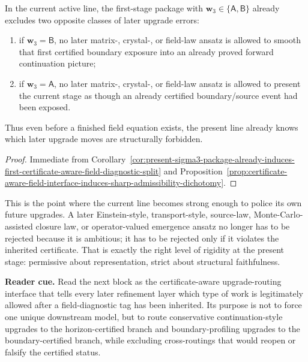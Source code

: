 \begin{corollary}
\label{cor:present-sigma3-package-already-excludes-wrong-kinds-of-field-law-upgrades}
In the current active line, the first-stage package with \(\mathbf w_3\in\{\mathsf A,\mathsf B\}\) already excludes two opposite classes of later upgrade errors:
\begin{enumerate}[label=(\roman*)]
  \item if \(\mathbf w_3=\mathsf B\), no later matrix-, crystal-, or field-law ansatz is allowed to smooth that first certified boundary exposure into an already proved forward continuation picture;
  \item if \(\mathbf w_3=\mathsf A\), no later matrix-, crystal-, or field-law ansatz is allowed to present the current stage as though an already certified boundary/source event had been exposed.
\end{enumerate}
Thus even before a finished field equation exists, the present line already knows which later upgrade moves are structurally forbidden.
\end{corollary}

\begin{proof}
Immediate from Corollary~\ref{cor:present-sigma3-package-already-induces-first-certificate-aware-field-diagnostic-split} and Proposition~\ref{prop:certificate-aware-field-interface-induces-sharp-admissibility-dichotomy}.
\end{proof}

\begin{remark}
\label{rem:what-this-admissibility-gate-now-buys}
This is the point where the current line becomes strong enough to police its own future upgrades. A later Einstein-style, transport-style, source-law, Monte-Carlo-assisted closure law, or operator-valued emergence ansatz no longer has to be rejected because it is ambitious; it has to be rejected only if it violates the inherited certificate. That is exactly the right level of rigidity at the present stage: permissive about representation, strict about structural faithfulness.
\end{remark}

\noindent\textbf{Reader cue.} Read the next block as the certificate-aware upgrade-routing interface that tells every later refinement layer which type of work is legitimately allowed after a field-diagnostic tag has been inherited. Its purpose is not to force one unique downstream model, but to route conservative continuation-style upgrades to the horizon-certified branch and boundary-profiling upgrades to the boundary-certified branch, while excluding cross-routings that would reopen or falsify the certified status.

